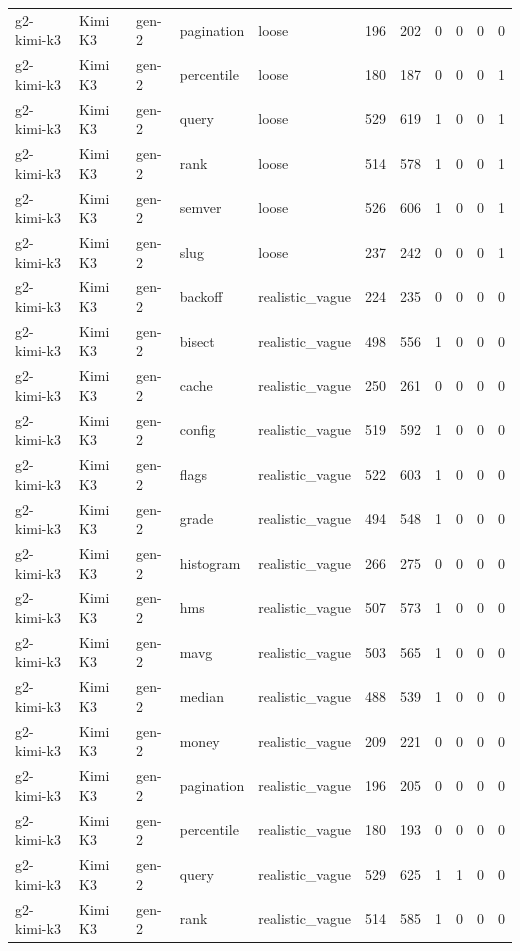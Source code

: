 \begin{tabular}{lllllllllll}
g2-kimi-k3 & Kimi K3 & gen-2 & pagination & loose & 196 & 202 & 0 & 0 & 0 & 0 \\
g2-kimi-k3 & Kimi K3 & gen-2 & percentile & loose & 180 & 187 & 0 & 0 & 0 & 1 \\
g2-kimi-k3 & Kimi K3 & gen-2 & query & loose & 529 & 619 & 1 & 0 & 0 & 1 \\
g2-kimi-k3 & Kimi K3 & gen-2 & rank & loose & 514 & 578 & 1 & 0 & 0 & 1 \\
g2-kimi-k3 & Kimi K3 & gen-2 & semver & loose & 526 & 606 & 1 & 0 & 0 & 1 \\
g2-kimi-k3 & Kimi K3 & gen-2 & slug & loose & 237 & 242 & 0 & 0 & 0 & 1 \\
g2-kimi-k3 & Kimi K3 & gen-2 & backoff & realistic\_vague & 224 & 235 & 0 & 0 & 0 & 0 \\
g2-kimi-k3 & Kimi K3 & gen-2 & bisect & realistic\_vague & 498 & 556 & 1 & 0 & 0 & 0 \\
g2-kimi-k3 & Kimi K3 & gen-2 & cache & realistic\_vague & 250 & 261 & 0 & 0 & 0 & 0 \\
g2-kimi-k3 & Kimi K3 & gen-2 & config & realistic\_vague & 519 & 592 & 1 & 0 & 0 & 0 \\
g2-kimi-k3 & Kimi K3 & gen-2 & flags & realistic\_vague & 522 & 603 & 1 & 0 & 0 & 0 \\
g2-kimi-k3 & Kimi K3 & gen-2 & grade & realistic\_vague & 494 & 548 & 1 & 0 & 0 & 0 \\
g2-kimi-k3 & Kimi K3 & gen-2 & histogram & realistic\_vague & 266 & 275 & 0 & 0 & 0 & 0 \\
g2-kimi-k3 & Kimi K3 & gen-2 & hms & realistic\_vague & 507 & 573 & 1 & 0 & 0 & 0 \\
g2-kimi-k3 & Kimi K3 & gen-2 & mavg & realistic\_vague & 503 & 565 & 1 & 0 & 0 & 0 \\
g2-kimi-k3 & Kimi K3 & gen-2 & median & realistic\_vague & 488 & 539 & 1 & 0 & 0 & 0 \\
g2-kimi-k3 & Kimi K3 & gen-2 & money & realistic\_vague & 209 & 221 & 0 & 0 & 0 & 0 \\
g2-kimi-k3 & Kimi K3 & gen-2 & pagination & realistic\_vague & 196 & 205 & 0 & 0 & 0 & 0 \\
g2-kimi-k3 & Kimi K3 & gen-2 & percentile & realistic\_vague & 180 & 193 & 0 & 0 & 0 & 0 \\
g2-kimi-k3 & Kimi K3 & gen-2 & query & realistic\_vague & 529 & 625 & 1 & 1 & 0 & 0 \\
g2-kimi-k3 & Kimi K3 & gen-2 & rank & realistic\_vague & 514 & 585 & 1 & 0 & 0 & 0 \\

\end{tabular}
